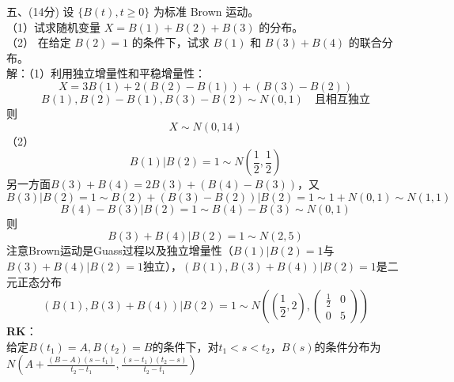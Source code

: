 \documentclass[UTF8]{ctexart}
\begin{document}
\noindent 五、(14分) 设 $\{B(t), t \geq 0\}$ 为标准 Brown 运动。\\
（1）试求随机变量 $X = B(1) + B(2) + B(3)$ 的分布。\\
（2） 在给定 $B(2) = 1$ 的条件下，试求 $B(1)$ 和 $B(3) + B(4)$ 的联合分布。\\
解：（1）利用独立增量性和平稳增量性：\\
\[
X=3B(1)+2(B(2)-B(1))+(B(3)-B(2))
\]
\[
B(1),B(2)-B(1),B(3)-B(2) \sim N(0,1) \quad \text{且相互独立}
\]
则
\[
X \sim N(0,14)
\]
（2）
\[
B(1)|B(2)=1 \sim N\left(\frac{1}{2},\frac{1}{2}\right)
\]
另一方面$B(3)+B(4)=2B(3)+(B(4)-B(3))$，又
\[
B(3)|B(2)=1 \sim B(2)+(B(3)-B(2))|B(2)=1\sim 1+N(0,1) \sim N(1,1)
\]
\[
B(4)-B(3)|B(2)=1\sim B(4)-B(3)\sim N(0,1)
\]
则
\[
B(3)+B(4)|B(2)=1 \sim N(2,5)
\]
注意Brown运动是Guass过程以及独立增量性（$B(1)|B(2)=1$与$B(3)+B(4)|B(2)=1$独立），$(B(1),B(3)+B(4))|B(2)=1$是二元正态分布
\[
(B(1),B(3)+B(4))|B(2)=1 \sim N\left( \left( \frac{1}{2},2\right),
\begin{pmatrix}
	\frac{1}{2} & 0\\
	0& 5
\end{pmatrix}
 \right) 
\]
\textbf{RK}：\\
给定$B(t_1)=A,B(t_2)=B$的条件下，对$t_1<s<t_2$，$B(s)$的条件分布为$N\left(A+\frac{(B-A)(s-t_1)}{t_2-t_1},\frac{(s-t_1)(t_2-s)}{t_2-t_1}\right)$\\
\end{document}
